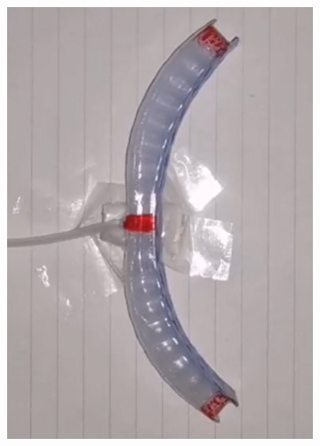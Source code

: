\documentclass[conference]{IEEEtran}
\begin{document}
\begin{figure}[htbp]
\begin{subfigure}[b]{0.25\linewidth}
    \includegraphics[width=\linewidth]{pics/变形2.png}
    \caption{}
    \label{fig:image2}
  \end{subfigure}
  \begin{subfigure}[b]{0.25\linewidth}
    \centering

\end{subfigure}
\end{figure}
\end{document}

